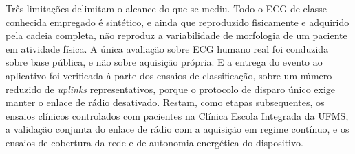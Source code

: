 Três limitações delimitam o alcance do que se mediu. Todo o \acs{ECG} de classe conhecida
empregado é sintético, e ainda que reproduzido fisicamente e adquirido pela cadeia completa,
não reproduz a variabilidade de morfologia de um paciente em atividade física. A única
avaliação sobre \acs{ECG} humano real foi conduzida sobre base pública, e não sobre aquisição
própria. E a entrega do evento ao aplicativo foi verificada à parte dos ensaios de classificação, sobre um
número reduzido de \textit{uplinks} representativos, porque o protocolo de disparo único exige
manter o enlace de rádio desativado. Restam, como etapas subsequentes, os ensaios clínicos
controlados com pacientes na Clínica Escola Integrada da \acs{UFMS}, a validação conjunta do
enlace de rádio com a aquisição em regime contínuo, e os ensaios de cobertura da rede e de
autonomia energética do dispositivo.
